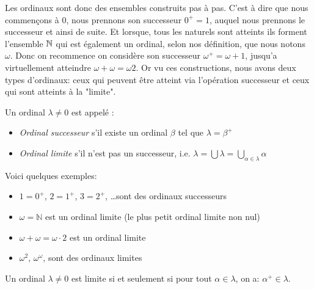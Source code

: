 \begin{remarque}
    Les ordinaux sont donc des ensembles construits pas à pas. C'est à dire que nous commençons à $0$, nous prennons son successeur $0^+=1$, auquel nous prennons le successeur et ainsi de suite. Et lorsque, tous les naturels sont atteints ils forment l'ensemble $\mathbb{N}$ qui est également un ordinal, selon nos définition, que nous notons $\omega$. Donc on recommence on considère son successeur $\omega^+=\omega+1$, jusqu'a virtuellement atteindre $\omega +\omega= \omega2$. Or vu ces constructions, nous avons deux types d'ordinaux: ceux qui peuvent être atteint via l'opération successeur et ceux qui sont atteints à la "limite". 
\end{remarque}

\begin{definition}
	Un ordinal $\lambda \neq 0$ est appelé :
	\begin{itemize}
		\item \emph{Ordinal successeur} s'il existe un ordinal $\beta$ tel que $\lambda = \beta^+$
		\item \emph{Ordinal limite} s'il n'est pas un successeur, i.e. $\lambda = \bigcup \lambda = \bigcup_{\alpha \in \lambda} \alpha$
	\end{itemize}
\end{definition}

\begin{exemple}
    Voici quelques exemples:
	\begin{itemize}
		\item $1 = 0^+$, $2 = 1^+$, $3 = 2^+$, \ldots sont des ordinaux successeurs
		\item $\omega = \mathbb{N}$ est un ordinal limite (le plus petit ordinal limite non nul)
		\item $\omega + \omega = \omega \cdot 2$ est un ordinal limite
		\item $\omega^2$, $\omega^\omega$, sont des ordinaux limites
	\end{itemize}
\end{exemple}

\begin{proposition}\label{prop:limite_reunion}
	Un ordinal $\lambda \neq 0$ est limite si et seulement si pour tout $\alpha \in \lambda$, on a: $\alpha^+ \in \lambda$.
\end{proposition}

